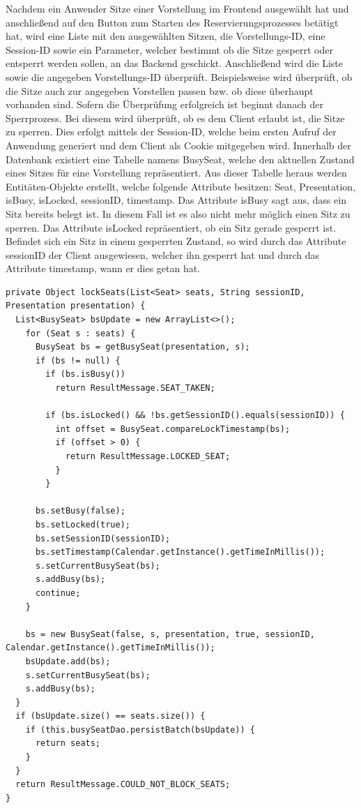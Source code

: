 	Nachdem ein Anwender Sitze einer Vorstellung im Frontend ausgewählt hat und anschließend auf den Button zum Starten des Reservierungsprozesses betätigt hat, wird eine Liste mit den ausgewählten Sitzen, die Vorstellungs-\ac{ID}, eine Session-\ac{ID} sowie ein Parameter, welcher bestimmt ob die Sitze gesperrt oder entsperrt werden sollen, an das Backend geschickt. Anschließend wird die Liste sowie die angegeben Vorstellungs-\ac{ID} überprüft. Beispielsweise wird überprüft, ob die Sitze auch zur angegeben Vorstellen passen bzw. ob diese überhaupt vorhanden sind. Sofern die Überprüfung erfolgreich ist beginnt danach der Sperrprozess. Bei diesem wird überprüft, ob es dem Client erlaubt ist, die Sitze zu sperren. Dies erfolgt mittels der Session-ID, welche beim ersten Aufruf der Anwendung generiert und dem Client als Cookie mitgegeben wird. Innerhalb der Datenbank existiert eine Tabelle namens \glqq BusySeat\grqq, welche den aktuellen Zustand eines Sitzes für eine Vorstellung repräsentiert. Aus dieser Tabelle heraus werden Entitäten-Objekte erstellt, welche folgende Attribute besitzen: \glqq Seat, Presentation, isBusy, isLocked, sessionID, timestamp\grqq. Das Attribute isBusy sagt aus, dass ein Sitz bereits belegt ist. In diesem Fall ist es also nicht mehr möglich einen Sitz zu sperren. Das Attribute isLocked repräsentiert, ob ein Sitz gerade gesperrt ist. Befindet sich ein Sitz in einem gesperrten Zustand, so wird durch das Attribute sessionID der Client ausgewiesen, welcher ihn gesperrt hat und durch das Attribute timestamp, wann er dies getan hat. 

\lstset{language=Java}
\begin{lstlisting}[caption={Implementierung zum Sperren von Sitzen}, label={lst:lockProcess}]
private Object lockSeats(List<Seat> seats, String sessionID, Presentation presentation) {
  List<BusySeat> bsUpdate = new ArrayList<>();
    for (Seat s : seats) {
      BusySeat bs = getBusySeat(presentation, s);
      if (bs != null) {
        if (bs.isBusy())
          return ResultMessage.SEAT_TAKEN;

        if (bs.isLocked() && !bs.getSessionID().equals(sessionID)) {
          int offset = BusySeat.compareLockTimestamp(bs);
          if (offset > 0) {
            return ResultMessage.LOCKED_SEAT;
          }
        }

      bs.setBusy(false);
      bs.setLocked(true);
      bs.setSessionID(sessionID);
      bs.setTimestamp(Calendar.getInstance().getTimeInMillis());
      s.setCurrentBusySeat(bs);
      s.addBusy(bs);
      continue;
    }

    bs = new BusySeat(false, s, presentation, true, sessionID, Calendar.getInstance().getTimeInMillis());
    bsUpdate.add(bs);
    s.setCurrentBusySeat(bs);
    s.addBusy(bs);
  }
  if (bsUpdate.size() == seats.size()) {
    if (this.busySeatDao.persistBatch(bsUpdate)) {
      return seats;
    }
  }
  return ResultMessage.COULD_NOT_BLOCK_SEATS;
}
\end{lstlisting}

